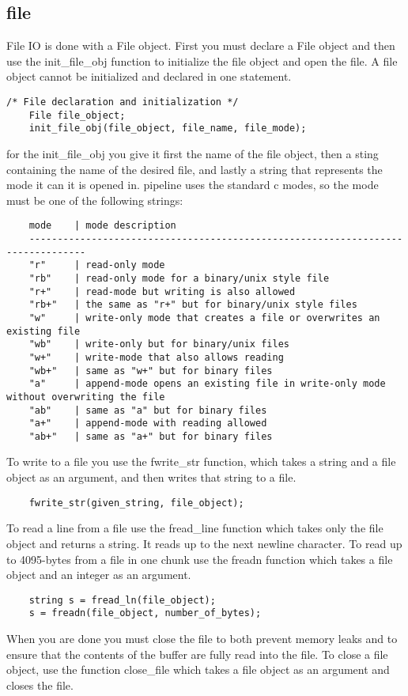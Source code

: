 \documentclass[./Report_main.tex]{subfiles}
\begin{document}
\subsection{file}
File IO is done with a File object. First you must declare a File object and then use the init\_file\_obj function to initialize the file object and open the file. A file object cannot be initialized and declared in one statement.
\begin{lstlisting}
/* File declaration and initialization */
	File file_object;
	init_file_obj(file_object, file_name, file_mode);
\end{lstlisting}
for the init_file_obj you give it first the name of the file object, then a sting containing the name of the desired file, and lastly a string that represents the mode it can it is opened in. pipeline uses the standard c modes, so the mode must be one of the following strings:
\begin{lstlisting}
	mode	| mode description
	--------------------------------------------------------------------------------
	"r" 	| read-only mode
	"rb"	| read-only mode for a binary/unix style file
	"r+"	| read-mode but writing is also allowed
	"rb+"	| the same as "r+" but for binary/unix style files
	"w"		| write-only mode that creates a file or overwrites an existing file
	"wb"	| write-only but for binary/unix files
	"w+"	| write-mode that also allows reading
	"wb+"	| same as "w+" but for binary files
	"a"		| append-mode opens an existing file in write-only mode without overwriting the file
	"ab"	| same as "a" but for binary files
	"a+"	| append-mode with reading allowed
	"ab+"	| same as "a+" but for binary files
\end{lstlisting}
To write to a file you use the fwrite_str function, which takes a string and a file object as an argument, and then writes that string to a file.
\begin{lstlisting}
	fwrite_str(given_string, file_object);
\end{lstlisting}
To read a line from a file use the fread_line function which takes only the file object and returns a string. It reads up to the next newline character. To read up to 4095-bytes from a file in one chunk use the freadn function which takes a file object and an integer as an argument.
\begin{lstlisting}
	string s = fread_ln(file_object);
	s = freadn(file_object, number_of_bytes);
\end{lstlisting}
When you are done you must close the file to both prevent memory leaks and to ensure that the contents of the buffer are fully read into the file. To close a file object, use the function close_file which takes a file object as an argument and closes the file.
\end{document}
